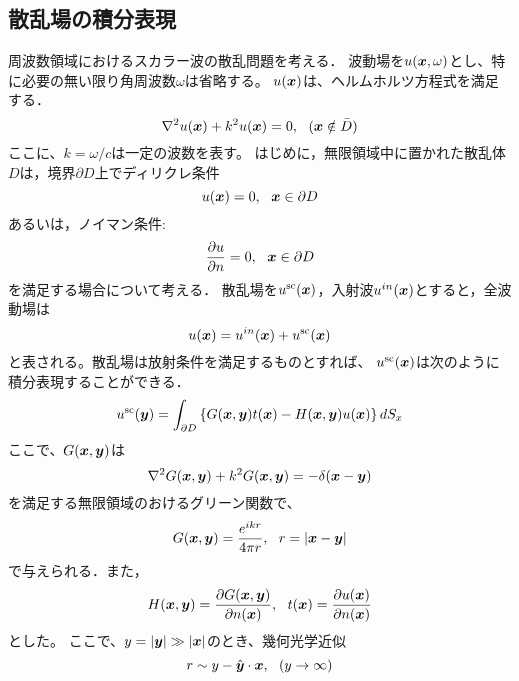 \documentclass[10pt,a4j,dvipdfmx]{jarticle}
\begin{document}
\subsection{散乱場の積分表現}
周波数領域におけるスカラー波の散乱問題を考える．
波動場を$u(\mbox{\boldmath $x$},\omega)$とし、特に必要の無い限り角周波数$\omega$は省略する。
$u(\mbox{\boldmath $x$})$は、ヘルムホルツ方程式を満足する．
\begin{equation}
	\nabla^2 u(\fat{x}) + k^2 u(\fat{x}) =0, \ \ (\fat{x} \notin \bar{D})
	\label{eqn:}
\end{equation}
ここに、$k=\omega/c$は一定の波数を表す。
はじめに，無限領域中に置かれた散乱体$D$は，境界$\partial D$上でディリクレ条件
\begin{equation}
	u(\mbox{\boldmath $x$}) = 0, \ \ \mbox{\boldmath $x$}\in \partial D
	\label{eqn:}
\end{equation}
あるいは，ノイマン条件:
\begin{equation}
	\frac{\partial u}{\partial n} = 0 ,\ \ \mbox{\boldmath $x$}\in \partial D
	\label{eqn:}
\end{equation}
を満足する場合について考える．
散乱場を$u^{\rm sc}(\mbox{\boldmath $x$})$，入射波$u^{in}(\mbox{\boldmath $x$})$とすると，全波動場は
\begin{equation}
	u(\mbox{\boldmath $x$})=u^{in}(\mbox{\boldmath $x$})+ u^{\rm sc}(\mbox{\boldmath $x$})
	\label{eqn:}
\end{equation}
と表される。散乱場は放射条件を満足するものとすれば、
$u^{\rm sc}(\mbox{\boldmath $x$})$は次のように積分表現することができる．
\begin{equation}
	u^{\rm sc}(\mbox{\boldmath $y$}) = \int _{\partial D} 
	\left\{
		G(\mbox{\boldmath $x$},\mbox{\boldmath $y$})t(\mbox{\boldmath $x$})
	-
		H(\mbox{\boldmath $x$},\mbox{\boldmath $y$})u(\mbox{\boldmath $x$})
	\right\} dS_x
	\label{eqn:}
\end{equation}
ここで、$G(\mbox{\boldmath $x$},\mbox{\boldmath $y$})$は
\begin{equation}
	\nabla^2 G(\mbox{\boldmath $x$},\mbox{\boldmath $y$}) + k^2 G(\mbox{\boldmath $x$},\mbox{\boldmath $y$}) =-\delta (\mbox{\boldmath $x$}-\mbox{\boldmath $y$} )
	\label{eqn:}
\end{equation}
を満足する無限領域のおけるグリーン関数で、
\begin{equation}
	G(\mbox{\boldmath $x$},\mbox{\boldmath $y$}) =\frac{e^{ikr}}{4\pi r}, \ \ r=\left| \mbox{\boldmath $x$}-\mbox{\boldmath $y$} \right|
	\label{eqn:Green}
\end{equation}
で与えられる．また，
\begin{equation}
	H(\fat{x},\fat{y}) = \frac{\partial G(\fat{x},\fat{y})}{\partial n(\fat{x})}, \ \ 
	t(\fat{x}) =\frac{\partial u(\fat{x})}{\partial n(\fat{x})}
	\label{eqn:}
\end{equation}
とした。
ここで、$y=\left|\mbox{\boldmath $y$}\right|\gg \left| \mbox{\boldmath $x$} \right|$のとき、幾何光学近似
\begin{equation}
	r\sim  y  -\hat{\fat{y}}\cdot \fat{x}, \ \ (y\rightarrow \infty)
	\label{eqn:para}
\end{equation}
\end{document}
